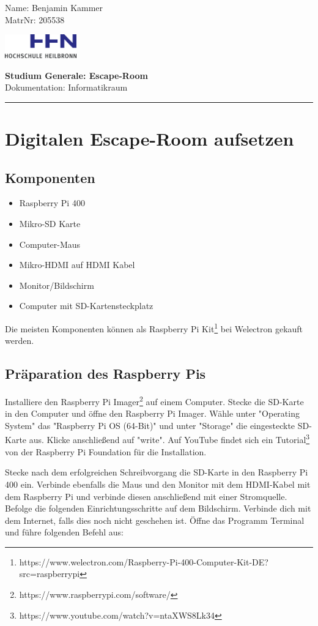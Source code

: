 \documentclass[12pt, letterpaper]{article}
\renewcommand\maketitle{
    \begin{flushleft}
        Name: Benjamin Kammer \\
        MatrNr: 205538
    \end{flushleft}

    \begin{flushright}\vspace{-15mm}
        \includegraphics[width=3.1cm]{logo.png}
    \end{flushright}

    \begin{center}
        \textbf{\large Studium Generale: Escape-Room}\\
        Dokumentation: Informatikraum
    \end{center}

    \rule{\linewidth}{0.1mm}

    \bigskip
}
\begin{document}
\maketitle

\section{Digitalen Escape-Room aufsetzen}
\subsection{Komponenten}

\begin{itemize}
	\item Raspberry Pi 400
    \item Mikro-SD Karte
	\item Computer-Maus
	\item Mikro-HDMI auf HDMI Kabel
	\item Monitor/Bildschirm
    \item Computer mit SD-Kartensteckplatz
\end{itemize}

Die meisten Komponenten können als Raspberry Pi Kit\footnote{https://www.welectron.com/Raspberry-Pi-400-Computer-Kit-DE?src=raspberrypi} bei Welectron gekauft werden.

\subsection{Präparation des Raspberry Pis}

Installiere den Raspberry Pi Imager\footnote{https://www.raspberrypi.com/software/} auf einem Computer.
Stecke die SD-Karte in den Computer und öffne den Raspberry Pi Imager.
Wähle unter "Operating System" das "Raspberry Pi OS (64-Bit)" und unter "Storage" die eingesteckte SD-Karte aus.
Klicke anschließend auf "write".
Auf YouTube findet sich ein Tutorial\footnote{https://www.youtube.com/watch?v=ntaXWS8Lk34} von der Raspberry Pi Foundation für die Installation.

Stecke nach dem erfolgreichen Schreibvorgang die SD-Karte in den Raspberry Pi 400 ein.
Verbinde ebenfalls die Maus und den Monitor mit dem HDMI-Kabel mit dem Raspberry Pi und verbinde diesen anschließend mit einer Stromquelle.
Befolge die folgenden Einrichtungsschritte auf dem Bildschirm.
Verbinde dich mit dem Internet, falls dies noch nicht geschehen ist.
Öffne das Programm Terminal und führe folgenden Befehl aus:
\end{document}
